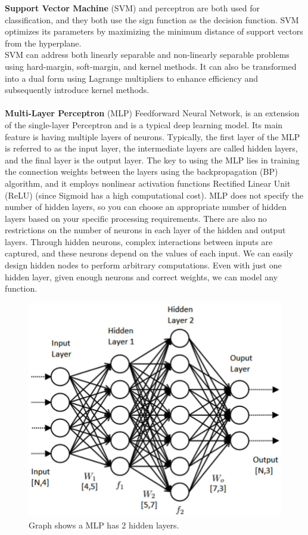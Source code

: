 \documentclass[10pt,twocolumn,letterpaper]{article}
\begin{document}
\noindent\textbf{Support Vector Machine} (SVM) and perceptron are both used for classification, and they both use the sign function as the decision function. SVM optimizes its parameters by maximizing the minimum distance of support vectors from the hyperplane\cite{suthaharan2016support}.\\
\indent SVM can address both linearly separable and non-linearly separable problems using hard-margin, soft-margin, and kernel methods. It can also be transformed into a dual form using Lagrange multipliers to enhance efficiency and subsequently introduce kernel methods\cite{suthaharan2016support}.\\
\\
\noindent\textbf{Multi-Layer Perceptron} (MLP) \wrt Feedforward Neural Network, is an extension of the single-layer Perceptron and is a typical deep learning model. Its main feature is having multiple layers of neurons. Typically, the first layer of the MLP is referred to as the input layer, the intermediate layers are called hidden layers, and the final layer is the output layer. The key to using the MLP lies in training the connection weights between the layers using the backpropagation\cite{werbos1990backpropagation} (BP) algorithm, and it employs nonlinear activation functions \eg Rectified Linear Unit\cite{glorot2011deep} (ReLU) (since Sigmoid has a high computational cost).
\indent MLP does not specify the number of hidden layers, so you can choose an appropriate number of hidden layers based on your specific processing requirements. There are also no restrictions on the number of neurons in each layer of the hidden and output layers. Through hidden neurons, complex interactions between inputs are captured, and these neurons depend on the values of each input. We can easily design hidden nodes to perform arbitrary computations. Even with just one hidden layer, given enough neurons and correct weights, we can model any function.
\begin{figure}[h]
	\centering
	\includegraphics[width=\columnwidth]{mlp}
	\caption{Graph shows a MLP has 2 hidden layers.}
	\label{fig:mlp}
\end{figure}
\end{document}
